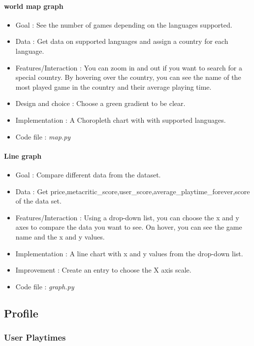 \documentclass{article}
\begin{document}
    \paragraph{world map graph}
    \begin{itemize}
        \item Goal : See the number of games depending on the languages supported.
        \item Data : Get data on supported languages and assign a country for each language.
        \item Features/Interaction : You can zoom in and out if you want to search for a special country. By hovering over the country, you can see the name of the most played game in the country and their average playing time.
        \item Design and choice : Choose a green gradient to be clear.
        \item Implementation : A Choropleth chart with with supported languages.
        \item Code file : \textit{map.py}
    \end{itemize}
    
    \paragraph{Line graph}
    \begin{itemize}
        \item Goal : Compare different data from the dataset.
        \item Data : Get price,metacritic\_score,user\_score,average\_playtime\_forever,score of the data set.
        \item Features/Interaction : Using a drop-down list, you can choose the x and y axes to compare the data you want to see. On hover, you can see the game name and the x and y values.
        \item Implementation : A line chart with x and y values from the drop-down list.
        \item Improvement : Create an entry to choose the X axis scale.
        \item Code file : \textit{graph.py}
    \end{itemize}

	\subsection{Profile}
    
   	\subsubsection{User Playtimes}
\end{document}

